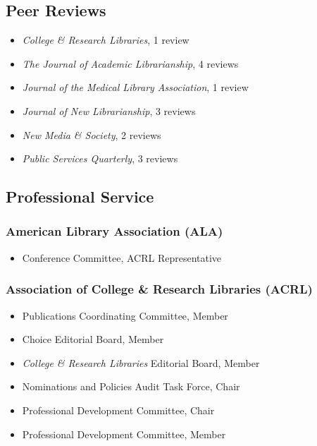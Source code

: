 \documentclass[
  letterpaper,
  DIV=11,
  numbers=noendperiod]{scrartcl}
\providecommand{\tightlist}{%
  \setlength{\itemsep}{0pt}\setlength{\parskip}{0pt}}\usepackage{longtable,booktabs,array}
\begin{document}
\subsection{\texorpdfstring{ Peer
Reviews}{ Peer Reviews}}\label{peer-reviews}

\begin{itemize}
\tightlist
\item
  \emph{College \& Research Libraries}, 1 review
\item
  \emph{The Journal of Academic Librarianship}, 4 reviews
\item
  \emph{Journal of the Medical Library Association}, 1 review
\item
  \emph{Journal of New Librarianship}, 3 reviews
\item
  \emph{New Media \& Society}, 2 reviews
\item
  \emph{Public Services Quarterly}, 3 reviews
\end{itemize}

\subsection{\texorpdfstring{ Professional
Service}{ Professional Service}}\label{professional-service}

\subsubsection{American Library Association
(ALA)}\label{american-library-association-ala}

\begin{itemize}
\tightlist
\item
  Conference Committee, ACRL Representative
\end{itemize}

\subsubsection{Association of College \& Research Libraries
(ACRL)}\label{association-of-college-research-libraries-acrl}

\begin{itemize}
\tightlist
\item
  Publications Coordinating Committee, Member
\item
  Choice Editorial Board, Member
\item
  \emph{College \& Research Libraries} Editorial Board, Member
\item
  Nominations and Policies Audit Task Force, Chair
\item
  Professional Development Committee, Chair
\item
  Professional Development Committee, Member
\end{itemize}
\end{document}

